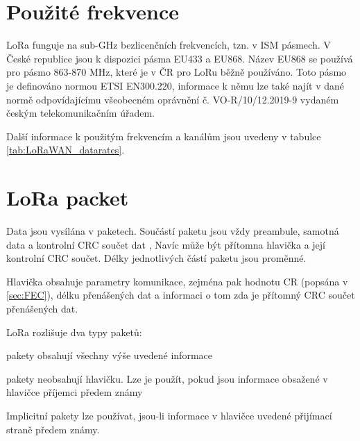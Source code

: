 \section{Použité frekvence}

    LoRa funguje na sub-GHz bezlicenčních frekvencích, tzn. v ISM pásmech. 
    V České republice jsou k dispozici pásma EU433 a EU868. Název EU868 se 
    používá pro pásmo 863-870 MHz, které je v ČR pro LoRu běžně používáno. 
    Toto pásmo je definováno normou ETSI EN300.220, informace k němu lze také 
    najít v dané normě odpovídajícímu všeobecném oprávnění č. VO-R/10/12.2019-9
    vydaném českým telekomunikačním úřadem.

    Další informace k použitým frekvencím a kanálům jsou uvedeny v tabulce
    \ref{tab:LoRaWAN_datarates}.



\section{LoRa packet}
    \label{subsubsec:LoRa_Packet}

    Data jsou vysílána v paketech. Součástí paketu jsou vždy preambule, 
    samotná data a kontrolní CRC součet dat ,
    Navíc může být přítomna hlavička a její kontrolní CRC součet.
    Délky jednotlivých částí paketu jsou proměnné. 
    
    Hlavička obsahuje parametry komunikace, zejména pak hodnotu CR (popsána v \ref{sec:FEC}), délku 
    přenášených dat a informaci o tom zda je přítomný 
    CRC součet přenášených dat. 
    
    LoRa rozlišuje dva typy paketů:

    \begin{description}
        \label{lst:LoRa_packet_types}
        \item [Explicitní] pakety obsahují všechny výše uvedené informace
        \item [Implicitni] pakety neobsahují hlavičku. Lze je použít, pokud jsou
            informace obsažené v hlavičce příjemci předem známy
    \end{description}

    Implicitní pakety lze používat, jsou-li informace v hlavičce uvedené 
    přijímací straně předem známy.

